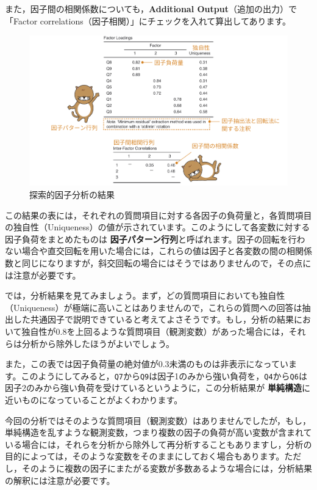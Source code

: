 \documentclass[
  12pt,
  a5jpaper,
  lualatex, ja=standard]{bxjsbook}
\renewcommand{\emph}[1]{\textbf{\color{emph} #1}}
\begin{document}
また，因子間の相関係数についても，\textbf{Additional Output}（追加の出力）で「Factor correlations（因子相関）」にチェックを入れて算出してあります。

\begin{figure}[!ht]

{\centering \includegraphics[width=1\linewidth]{images/factor/efa-factor-results} 

}

\caption{探索的因子分析の結果}\label{fig:factor-efa-factor-results}
\end{figure}

この結果の表には，それぞれの質問項目に対する各因子の負荷量と，各質問項目の独自性（Uniqueness）の値が示されています。このようにして各変数に対する因子負荷をまとめたものは\emph{因子パターン行列}と呼ばれます。因子の回転を行わない場合や直交回転を用いた場合には，これらの値は因子と各変数の間の相関係数と同じになりますが，斜交回転の場合にはそうではありませんので，その点には注意が必要です。

では，分析結果を見てみましょう。まず，どの質問項目においても独自性（Uniqueness）が極端に高いことはありませんので，これらの質問への回答は抽出した共通因子で説明できていると考えてよさそうです。もし，分析の結果において独自性が0.8を上回るような質問項目（観測変数）があった場合には，それらは分析から除外したほうがよいでしょう。

また，この表では因子負荷量の絶対値が0.3未満のものは非表示になっています。このようにしてみると，\texttt{Q7}から\texttt{Q9}は因子1のみから強い負荷を，\texttt{Q4}から\texttt{Q6}は因子2のみから強い負荷を受けているというように，この分析結果が\emph{単純構造}に近いものになっていることがよくわかります。

今回の分析ではそのような質問項目（観測変数）はありませんでしたが，もし，単純構造を乱すような観測変数，つまり複数の因子の負荷が高い変数が含まれている場合には，それらを分析から除外して再分析することもありますし，分析の目的によっては，そのような変数をそのままにしておく場合もあります。ただし，そのように複数の因子にまたがる変数が多数あるような場合には，分析結果の解釈には注意が必要です。
\end{document}
